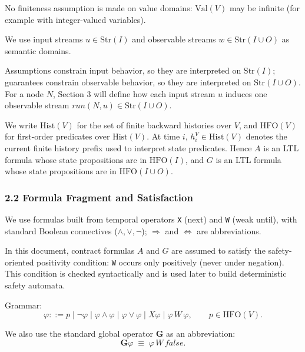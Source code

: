 \documentclass[
]{article}
\begin{document}
No finiteness assumption is made on value domains: \(\mathrm{Val}(V)\)
may be infinite (for example with integer-valued variables).

We use input streams \(u \in \mathrm{Str}(I)\) and observable streams
\(w \in \mathrm{Str}(I \cup O)\) as semantic domains.

Assumptions constrain input behavior, so they are interpreted on
\(\mathrm{Str}(I)\); guarantees constrain observable behavior, so they
are interpreted on \(\mathrm{Str}(I \cup O)\). For a node \(N\), Section
3 will define how each input stream \(u\) induces one observable stream
\(run(N,u)\in\mathrm{Str}(I\cup O)\).

We write \(\mathrm{Hist}(V)\) for the set of finite backward histories
over \(V\), and \(\mathrm{HFO}(V)\) for first-order predicates over
\(\mathrm{Hist}(V)\). At time \(i\), \(h_i^V\in\mathrm{Hist}(V)\)
denotes the current finite history prefix used to interpret state
predicates. Hence \(A\) is an LTL formula whose state propositions are
in \(\mathrm{HFO}(I)\), and \(G\) is an LTL formula whose state
propositions are in \(\mathrm{HFO}(I\cup O)\).

\subsubsection{2.2 Formula Fragment and
Satisfaction}\label{formula-fragment-and-satisfaction}

We use formulas built from temporal operators \texttt{X} (next) and
\texttt{W} (weak until), with standard Boolean connectives
(\(\land,\lor,\neg\)); \(\Rightarrow\) and \(\Leftrightarrow\) are
abbreviations.

In this document, contract formulas \(A\) and \(G\) are assumed to
satisfy the safety-oriented positivity condition: \texttt{W} occurs only
positively (never under negation). This condition is checked
syntactically and is used later to build deterministic safety automata.

Grammar: \[
\varphi ::= p \mid \neg\varphi \mid \varphi \land \varphi \mid \varphi \lor \varphi \mid X\varphi \mid \varphi \,W\, \varphi,
\qquad p\in\mathrm{HFO}(V).
\]

We also use the standard global operator \(\mathbf{G}\) as an
abbreviation: \[
\mathbf{G}\varphi \;\equiv\; \varphi\,W\,false.
\]
\end{document}
